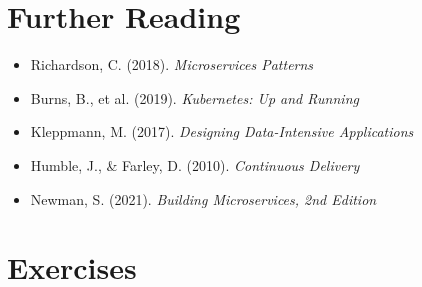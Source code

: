 \section{Further Reading}

\begin{itemize}
    \item Richardson, C. (2018). \textit{Microservices Patterns}
    \item Burns, B., et al. (2019). \textit{Kubernetes: Up and Running}
    \item Kleppmann, M. (2017). \textit{Designing Data-Intensive Applications}
    \item Humble, J., \& Farley, D. (2010). \textit{Continuous Delivery}
    \item Newman, S. (2021). \textit{Building Microservices, 2nd Edition}
\end{itemize}

\section{Exercises}

